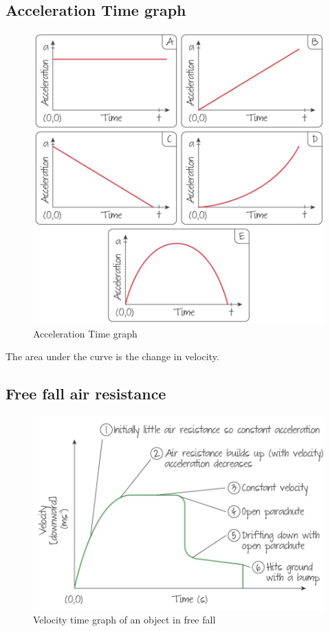 \documentclass[../notes.tex]{subfiles}
\begin{document}
\subsection{Acceleration Time graph}
\begin{figure}[h]
\begin{center}
	\includegraphics[width=\textwidth]{./figures/acceleration-time.jpg}
	\caption{Acceleration Time graph}
\end{center}
\end{figure}

The area under the curve is the change in velocity.

\subsection{Free fall air resistance}
\begin{figure}[h]
\begin{center}
	\includegraphics[width=\textwidth]{./figures/velocity-freefall.jpg}
	\caption{Velocity time graph of an object in free fall}
\end{center}
\end{figure}
\end{document}
